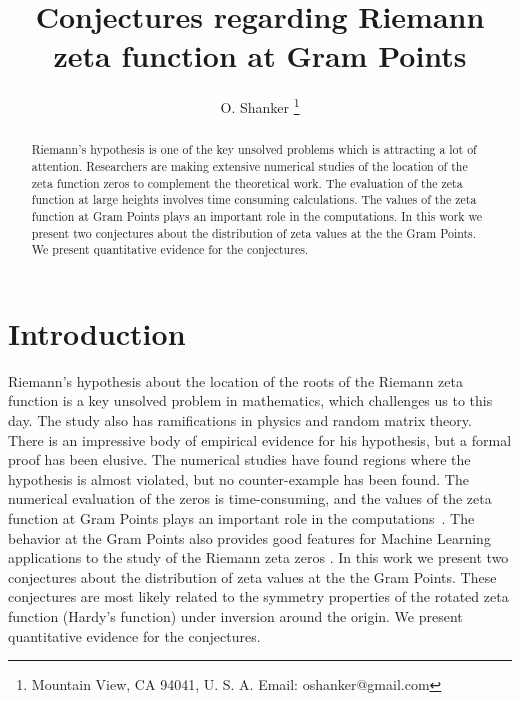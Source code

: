 \documentclass[twoside]{article}
\begin{document}
\date{}
\lhead[]{}
\rhead[]{}

\title{\bf{Conjectures regarding Riemann zeta function at Gram Points}}


\author{O. Shanker 
 \thanks{Mountain View, CA 94041, U. S. A. Email: oshanker@gmail.com
 }
}

\maketitle
\thispagestyle{fancy}

\begin{abstract}
Riemann's hypothesis is one of the key unsolved problems which is attracting
a lot of attention. 
Researchers are making extensive numerical studies of the location of the 
zeta function zeros to complement the theoretical work. 
The evaluation of the zeta function at large heights involves time consuming
calculations. The values of the 
zeta function at Gram Points plays an important role in the computations. In 
this work we present two conjectures about the distribution of zeta values at the 
the Gram Points. We present quantitative evidence for the conjectures.
\end{abstract}




\clearpage
{}


\section{Introduction}
Riemann's hypothesis about the location of 
the roots of the Riemann zeta function is a key unsolved problem in mathematics,
which challenges us to this day. The study also has ramifications in physics and
random matrix theory. 
There is an impressive body of empirical evidence for his hypothesis,
but a formal proof has been elusive. The numerical studies have found
regions where the hypothesis is almost violated, but no counter-example has
been found. The numerical evaluation of the zeros is time-consuming, and the values of the 
zeta function at Gram Points plays an important role in the computations~\cite{korolev1,korolev2}.  The behavior at the Gram Points also provides good features for  Machine Learning applications to the study of the Riemann zeta zeros \cite{osneural,osentropy}.  In 
this work we present two conjectures about the distribution of zeta values at the 
the Gram Points. These conjectures are most likely related to the symmetry properties of the rotated zeta function (Hardy's function) under inversion around the origin. We present quantitative evidence for the conjectures. 
\end{document}
